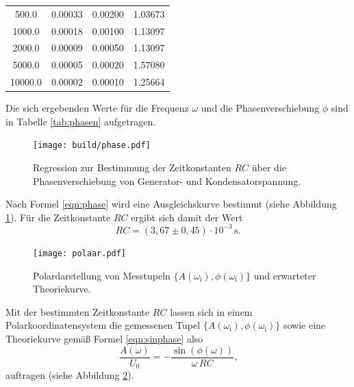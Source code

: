 \begin{table}
\begin{tabular}{cccc}
		500.0                 & 0.00033              & 0.00200              & 1.03673                 \\
		1000.0                & 0.00018              & 0.00100              & 1.13097                 \\
		2000.0                & 0.00009              & 0.00050              & 1.13097                 \\
		5000.0                & 0.00005              & 0.00020              & 1.57080                 \\
		10000.0               & 0.00002              & 0.00010              & 1.25664                 \\
		\bottomrule
	\end{tabular}
\end{table}

Die sich ergebenden Werte für die Frequenz $\omega$ und die Phasenverschiebung $\phi$ sind in Tabelle \ref{tab:phasen} aufgetragen.
\begin{figure}
	\centering
	\texttt{[image: build/phase.pdf]}
	\caption{Regression zur Bestimmung der Zeitkonstanten $RC$ über die Phasenverschiebung von Generator- und Kondensatorspannung.}
	\label{fig:phasi}
\end{figure}
Nach Formel \eqref{eqn:phase} wird eine Ausgleichskurve bestimmt (siehe Abbildung \ref{fig:phasi}).
Für die Zeitkonstante $RC$ ergibt sich damit der Wert
\begin{equation*}
	RC = (3,67 \pm 0,45) \cdot 10^{-3} \, \si{\second} .
\end{equation*}

\begin{figure}
	\centering
	\texttt{[image: polaar.pdf]}
	\caption{Polardarstellung von Messtupeln $\{A(\omega_{\text{i}}), \phi(\omega_{\text{i}}) \}$ und erwarteter Theoriekurve.}
	\label{fig:polari}
\end{figure}

Mit der bestimmten Zeitkonstante $RC$ lassen sich in einem Polarkoordinatensystem die gemessenen Tupel $\{A(\omega_{\text{i}}), \phi(\omega_{\text{i}}) \}$ sowie eine Theoriekurve gemäß Formel \eqref{eqn:sinphase} also
\begin{equation}
	\frac{A({\omega})}{U_0} = - \frac{\sin(\phi(\omega))}{\omega \, RC} \text{,}
\end{equation}
auftragen (siehe Abbildung \ref{fig:polari}).

